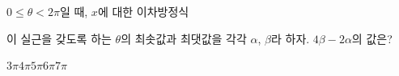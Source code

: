 $0\le\theta<2\pi$일 때, $x$에 대한 이차방정식 \par\smallskip{}\par\smallskip\noindent 이 실근을 갖도록 하는 $\theta$의 최솟값과 최댓값을 각각 $\alpha$, $\beta$라 하자. $4\beta-2\alpha$의 값은?
\begin{choices32}{$3\pi$}{$4\pi$}{$5\pi$}{$6\pi$}{$7\pi$}\end{choices32}
